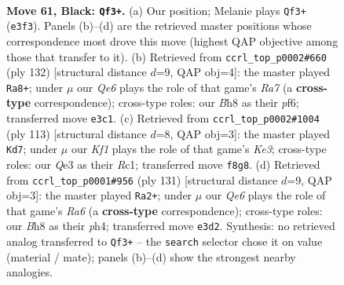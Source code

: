\documentclass[11pt]{article}
\begin{document}
\clearpage

\begin{figure}[p]\centering
\begin{subfigure}{0.46\textwidth}\centering
\resizebox{\linewidth}{!}{%
\newchessgame
\chessboard[
  setfen={5k1b/5p2/8/1R1P4/8/4q3/8/5K2 b - - 0 61},
  showmover=false,
  pgfstyle=straightmove, color=movearrow, markmove={e3-f3}
]}
\caption{}
\end{subfigure}\hfill
\begin{subfigure}{0.46\textwidth}\centering
\resizebox{\linewidth}{!}{%
\newchessgame
\chessboard[
  setfen={6k1/R7/5ppr/8/5P2/6K1/8/8 w - - 0 67},
  showmover=false,
  pgfstyle=straightmove, color=movearrow, markmove={a7-a8}
]}
\caption{}
\end{subfigure}
\\[4pt]
\begin{subfigure}{0.46\textwidth}\centering
\resizebox{\linewidth}{!}{%
\newchessgame
\chessboard[
  setfen={8/8/4k3/4p3/8/3K1PR1/8/2r5 b - - 0 57},
  showmover=false,
  pgfstyle=straightmove, color=movearrow, markmove={e6-d7}
]}
\caption{}
\end{subfigure}\hfill
\begin{subfigure}{0.46\textwidth}\centering
\resizebox{\linewidth}{!}{%
\newchessgame
\chessboard[
  setfen={8/6k1/6p1/8/4R1PP/r7/6K1/8 b - - 11 66},
  showmover=false,
  pgfstyle=straightmove, color=movearrow, markmove={a3-a2}
]}
\caption{}
\end{subfigure}
\caption{\textbf{Move 61, Black: \texttt{Qf3+}.} (a) Our position; Melanie plays \texttt{Qf3+} (\texttt{e3f3}). Panels (b)--(d) are the retrieved master positions whose correspondence most drove this move (highest QAP objective among those that transfer to it). (b) Retrieved from \texttt{ccrl\_top\_p0002\#660} (ply 132) [structural distance $d$=9, QAP obj=4]: the master played \texttt{Ra8+}; under $\mu$ our \emph{Qe6} plays the role of that game's \emph{Ra7} (a \textbf{cross-type} correspondence); cross-type roles: our \emph{B}h8 as their \emph{p}f6; transferred move \texttt{e3c1}. (c) Retrieved from \texttt{ccrl\_top\_p0002\#1004} (ply 113) [structural distance $d$=8, QAP obj=3]: the master played \texttt{Kd7}; under $\mu$ our \emph{Kf1} plays the role of that game's \emph{Ke3}; cross-type roles: our \emph{Q}e3 as their \emph{R}c1; transferred move \texttt{f8g8}. (d) Retrieved from \texttt{ccrl\_top\_p0001\#956} (ply 131) [structural distance $d$=9, QAP obj=3]: the master played \texttt{Ra2+}; under $\mu$ our \emph{Qe6} plays the role of that game's \emph{Ra6} (a \textbf{cross-type} correspondence); cross-type roles: our \emph{B}h8 as their \emph{p}h4; transferred move \texttt{e3d2}. Synthesis: no retrieved analog transferred to \texttt{Qf3+} -- the \texttt{search} selector chose it on value (material / mate); panels (b)--(d) show the strongest nearby analogies.}
\label{fig:thought-m121}
\end{figure}
\end{document}
